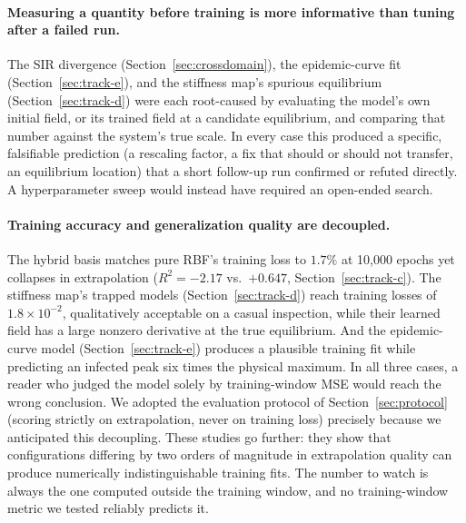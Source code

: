 \paragraph{Measuring a quantity before training is more informative than
tuning after a failed run.} The SIR divergence (Section~\ref{sec:crossdomain}),
the epidemic-curve fit (Section~\ref{sec:track-e}), and the stiffness map's
spurious equilibrium (Section~\ref{sec:track-d}) were each root-caused by
evaluating the model's own initial field, or its trained field at a candidate
equilibrium, and comparing that number against the system's true scale. In
every case this produced a specific, falsifiable prediction (a rescaling
factor, a fix that should or should not transfer, an equilibrium location)
that a short follow-up run confirmed or refuted directly. A hyperparameter
sweep would instead have required an open-ended search.

\paragraph{Training accuracy and generalization quality are decoupled.} The
hybrid basis matches pure RBF's training loss to $1.7\%$ at 10{,}000 epochs
yet collapses in extrapolation ($R^2=-2.17$ vs.\ $+0.647$,
Section~\ref{sec:track-c}). The stiffness map's trapped models
(Section~\ref{sec:track-d}) reach training losses of $1.8\times10^{-2}$,
qualitatively acceptable on a casual inspection, while their learned field
has a large nonzero derivative at the true equilibrium. And the
epidemic-curve model (Section~\ref{sec:track-e}) produces a plausible
training fit while predicting an infected peak six times the physical
maximum. In all three cases, a reader who judged the model solely by
training-window MSE would reach the wrong conclusion. We adopted the
evaluation protocol of Section~\ref{sec:protocol} (scoring strictly on
extrapolation, never on training loss) precisely because we anticipated this
decoupling. These studies go further: they show that configurations
differing by two orders of magnitude in extrapolation quality can produce
numerically indistinguishable training fits. The number to watch is always
the one computed outside the training window, and no training-window metric
we tested reliably predicts it.

